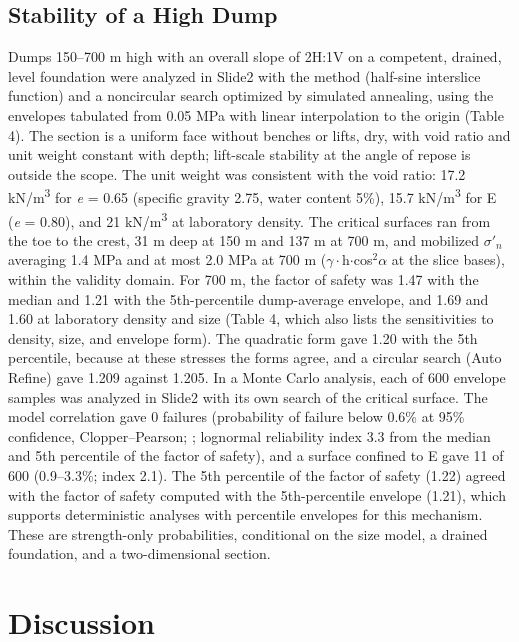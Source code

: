 \documentclass[Journal,letterpaper]{ascelike-new}
\begin{document}
\subsection{Stability of a High Dump}
Dumps 150--700 m high with an overall slope of 2H:1V on a competent, drained, level foundation were analyzed in Slide2 \cite{rocscience} with the  method (half-sine interslice function) and a noncircular search optimized by simulated annealing, using the envelopes tabulated from 0.05 MPa with linear interpolation to the origin (Table 4). The section is a uniform face without benches or lifts, dry, with void ratio and unit weight constant with depth; lift-scale stability at the angle of repose is outside the scope. The unit weight was consistent with the void ratio: 17.2 kN/m\textsuperscript{3} for \textit{e} = 0.65 (specific gravity 2.75, water content 5\%), 15.7 kN/m\textsuperscript{3} for E (\textit{e} = 0.80), and 21 kN/m\textsuperscript{3} at laboratory density. The critical surfaces ran from the toe to the crest, 31 m deep at 150 m and 137 m at 700 m, and mobilized $\sigma'_n$ averaging 1.4 MPa and at most 2.0 MPa at 700 m ($\gamma\cdot$h$\cdot$cos$^{2}\alpha$ at the slice bases), within the validity domain. For 700 m, the factor of safety was 1.47 with the median and 1.21 with the 5th-percentile dump-average envelope, and 1.69 and 1.60 at laboratory density and size (Table 4, which also lists the sensitivities to density, size, and envelope form). The quadratic form gave 1.20 with the 5th percentile, because at these stresses the forms agree, and a circular search (Auto Refine) gave 1.209 against 1.205. In a Monte Carlo analysis, each of 600 envelope samples was analyzed in Slide2 with its own search of the critical surface. The model correlation gave 0 failures (probability of failure below 0.6\% at 95\% confidence, Clopper--Pearson; ; lognormal reliability index 3.3 from the median and 5th percentile of the factor of safety), and a surface confined to E gave 11 of 600 (0.9--3.3\%; index 2.1). The 5th percentile of the factor of safety (1.22) agreed with the factor of safety computed with the 5th-percentile envelope (1.21), which supports deterministic analyses with percentile envelopes for this mechanism. These are strength-only probabilities, conditional on the size model, a drained foundation, and a two-dimensional section.

\section{Discussion}
\end{document}
